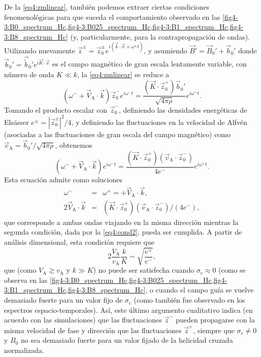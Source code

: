 De la \cref{eq4:zmlinear}, también podemos extraer ciertas condiciones
fenomenológicas para que suceda el comportamiento observado en las
\cref{fig4-3:B0_spectrum_Hc,fig4-3:B025_spectrum_Hc,fig4-3:B1_spectrum_Hc,fig4-3:B8_spectrum_Hc}
(y, particularmente, para la contrapropagación
de ondas). Utilizando nuevamente $\vec{z}^\pm = \vec{z}_0^\pm
e^{i(\vec{k}\cdot \vec{x}+\omega^\pm t)}$, y asumiendo $\vec{B}' =
\vec{B}_0' + \vec{b}_0'$ donde $\vec{b}_0' =
\vec{\tilde{b}}_0'e^{i\vec{K} \cdot \vec{x}}$ es el campo magnético de
gran escala lentamente variable, con número de onda $K \ll k$, la
\cref{eq4:zmlinear} se reduce a
\begin{equation}
\left( \omega^- +\vec{V}_\textrm{A} \cdot \vec{k} \right) 
    \vec{z}_0^- e^{i \omega^- t} = 
    \frac{\left(\vec{K} \cdot \vec{z}_0^+\right) \vec{b}_0'}{\sqrt{4\pi \rho}} 
    e^{i \omega^+ t} .
\end{equation}
Tomando el producto escalar con $\vec{z}_0^-$, definiendo las
densidades energéticas de Els\"asser $e^\pm = |\vec{z}_0^\pm|^2/4$, y
definiendo las fluctuaciones en la velocidad de Alfvén (asociadas a
las fluctuaciones de gran escala del campo magnético) como
$\vec{v}_\textrm{A} = \vec{b}_0'/\sqrt{4\pi \rho}$, obtenemos
\begin{equation}
\left( \omega^- + \vec{V}_\textrm{A} \cdot \vec{k} \right)
    e^{i \omega^- t} = 
    \frac{\left(\vec{K} \cdot \vec{z}_0^+\right)
    \left(\vec{v}_\textrm{A} \cdot \vec{z}_0^-\right)}
    {4e^-} 
    e^{i \omega^+ t} .
\end{equation}
Esta ecuación admite como soluciones
\begin{eqnarray}
    \omega^- &=& \omega^+ =
    + \vec{V}_\textrm{A} \cdot \vec{k}, 
    \label{eq4:cond1} \\
    2 \vec{V}_\textrm{A} \cdot \vec{k} &=& 
    \left(\vec{K} \cdot \vec{z}_0^+\right)
    \left(\vec{v}_\textrm{A} \cdot \vec{z}_0^-\right) /
    (4e^-), \label{eq4:cond2}
\end{eqnarray}
que corresponde a ambas ondas viajando en la misma dirección mientras
la segunda condición, dada por la \cref{eq4:cond2}, pueda ser
cumplida. A partir de análisis dimensional, esta condición requiere
que
\begin{equation}
    2 \frac{V_\textrm{A}}{v_\textrm{A}} \frac{k}{K}
    \sim \sqrt{\frac{e^+}{e^-}},
\end{equation}
que (como $V_\textrm{A}\gtrsim v_\textrm{A}$ y $k\gg K$) no puede ser
satisfecha cuando $\sigma_c \approx 0$ (como se observa en las
\cref{fig4-3:B0_spectrum_Hc,fig4-3:B025_spectrum_Hc,fig4-3:B1_spectrum_Hc,fig4-3:B8_spectrum_Hc},
o cuando el campo guía se vuelve demasiado
fuerte para un valor fijo de $\sigma_c$ (como también fue observado en
los espectros espacio-temporales). Así, este último argumento
cualitativo indica (en acuerdo con las simulaciones) que las
fluctuaciones $\vec{z}^-$ pueden propagarse con la misma velocidad de
fase y dirección que las fluctuaciones $\vec{z}^+$, siempre que
$\sigma_c \neq 0$ y $B_0$ no sea demasiado fuerte para un valor fijado
de la helicidad cruzada normalizada.

